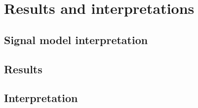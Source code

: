 \chapter{Results and interpretations}
\label{chap:results}

\section{Signal model interpretation}
\label{sec:signalModel}

\section{Results}

\section{Interpretation}
